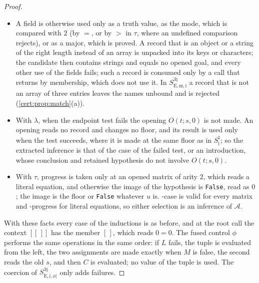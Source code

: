 \begin{proof}
\begin{itemize}
integer or Boolean leaf of the goal; so $H$ contains no string, \texttt{null}, object or NaN
(the goal contains none, so the shortcut of list equality by identity of the one NaN object of
the reader cannot apply), and its floating-point leaves are integral. Replacing each of them by
the equal integer gives a tree of integers and arrays with the same reading that is equal to
the goal. The opened component $O(t;[s,u,t],3)$ is unchanged by the replacement: if the image
is inserted it contains no floating-point value, and a floating-point leaf of $t$ is in the
range of the opener exactly where the equal integer is, where it fails the leaf test or the
coercion, and is a hole otherwise, as the integer is. So \cref{cert:lem:closed-leaf} applies.
\item A field is otherwise used only as a truth value, as the mode, which is compared with $2$
(by $=$, or by $>$ in $\tau$, where an undefined comparison rejects), or as a major, which is
proved. A record that is an object or a string of the right length instead of an array is
unpacked into its keys or characters; the candidate then contains strings and equals no opened
goal, and every other use of the fields fails; such a record is consumed only by a call that
returns by membership, which does not use it. In $S^{3\natural}_{\mathrm{E,m,i}}$ a record that is not an
array of three entries leaves the names unbound and is rejected (\cref{cert:prop:match}(a)).
\item With $\lambda$, when the endpoint test fails the opening $O(t;s,0)$ is not made. An
opening reads no record and changes no floor, and its result is used only when the test
succeeds, where it is made at the same floor as in $S^{\natural}_{\mathrm i}$; so the extracted
inference is that of the case of the failed test,  or an introduction, whose
conclusion and retained hypothesis do not involve $O(t;s,0)$.
\item With $\tau$, progress is taken only at an opened matrix of arity $2$, which reads a literal
equation, and otherwise the image of the hypothesis is \texttt{False}, read as $0$; the image is
the floor or \texttt{False} whatever $u$ is. -case is valid for every matrix and
-progress for literal equations, so either selection is an inference of
$\mathcal A$.
\end{itemize}
With these facts every case of the inductions is as before, and at the root call the context
$[[\,]]$ has the member $[\,]$, which reads $0=0$. The fused control $\phi$ performs the same
operations in the same order: if $L$ fails, the tuple is evaluated from the left, the two
assignments are made exactly when $M$ is false, the second reads the old $s$, and then $C$ is
evaluated; no value of the tuple is used. The coercion of $S^{3\natural}_{\mathrm{E,i},\phi|}$
only adds failures.


\end{proof}
